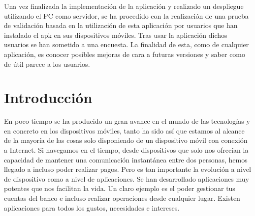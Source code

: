 \documentclass[a4paper, 12pt]{book}
\begin{document}
Una vez finalizada la implementaci\'on de la aplicaci\'on y realizado un despliegue utilizando el PC como servidor, se ha procedido con la realizaci\'on de una prueba de validaci\'on basada en la utilizaci\'on de esta aplicaci\'on por usuarios que han instalado el apk en sus dispositivos m\'oviles. Tras usar la aplicaci\'on dichos usuarios se han sometido a una encuesta. La finalidad de esta, como de cualquier aplicaci\'on, es conocer posibles mejoras de cara a futuras versiones y saber como de \'util parece a los usuarios.








\tableofcontents 
\cleardoublepage
\listoffigures %



\cleardoublepage
\chapter{Introducci\'on}
\label{sec:intro} %

En poco tiempo se ha producido un gran avance en el mundo de las tecnolog\'ias y en concreto
en los dispositivos m\'oviles, tanto ha sido as\'i que estamos al alcance de la mayor\'ia de las
cosas solo disponiendo de un dispositivo m\'ovil con conexi\'on a Internet. Si navegamos en el
tiempo, desde dispositivos que solo nos ofrec\'ian la capacidad de mantener una comunicaci\'on
instant\'anea entre dos personas, hemos llegado a incluso poder realizar pagos. Pero es tan importante
la evoluci\'on a nivel de dispositivo como a nivel de aplicaciones. Se han desarrollado
aplicaciones muy potentes que nos facilitan la vida. Un claro ejemplo es el poder gestionar tus
cuentas del banco e incluso realizar operaciones desde cualquier lugar. Existen aplicaciones
para todos los gustos, necesidades e intereses.
\end{document}
